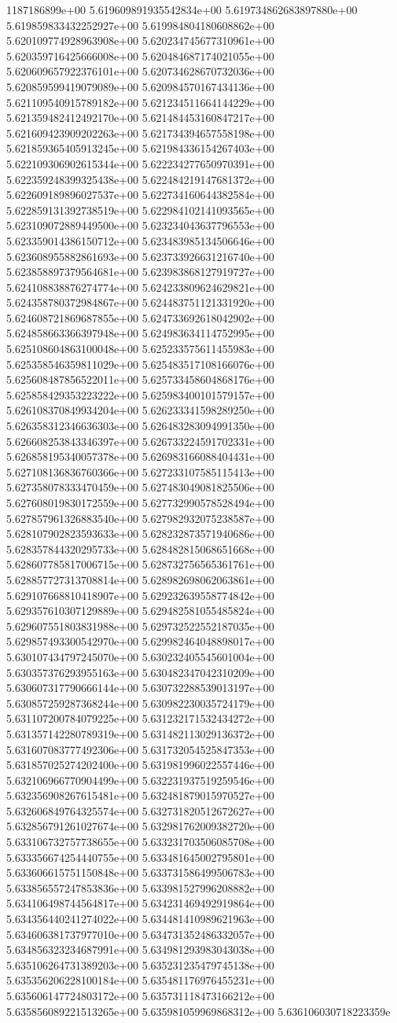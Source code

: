 1187186899e+00	5.619609891935542834e+00	5.619734862683897880e+00	5.619859833432252927e+00	5.619984804180608862e+00	5.620109774928963908e+00	5.620234745677310961e+00	5.620359716425666008e+00	5.620484687174021055e+00	5.620609657922376101e+00	5.620734628670732036e+00	5.620859599419079089e+00	5.620984570167434136e+00	5.621109540915789182e+00	5.621234511664144229e+00	5.621359482412492170e+00	5.621484453160847217e+00	5.621609423909202263e+00	5.621734394657558198e+00	5.621859365405913245e+00	5.621984336154267403e+00	5.622109306902615344e+00	5.622234277650970391e+00	5.622359248399325438e+00	5.622484219147681372e+00	5.622609189896027537e+00	5.622734160644382584e+00	5.622859131392738519e+00	5.622984102141093565e+00	5.623109072889449500e+00	5.623234043637796553e+00	5.623359014386150712e+00	5.623483985134506646e+00	5.623608955882861693e+00	5.623733926631216740e+00	5.623858897379564681e+00	5.623983868127919727e+00	5.624108838876274774e+00	5.624233809624629821e+00	5.624358780372984867e+00	5.624483751121331920e+00	5.624608721869687855e+00	5.624733692618042902e+00	5.624858663366397948e+00	5.624983634114752995e+00	5.625108604863100048e+00	5.625233575611455983e+00	5.625358546359811029e+00	5.625483517108166076e+00	5.625608487856522011e+00	5.625733458604868176e+00	5.625858429353223222e+00	5.625983400101579157e+00	5.626108370849934204e+00	5.626233341598289250e+00	5.626358312346636303e+00	5.626483283094991350e+00	5.626608253843346397e+00	5.626733224591702331e+00	5.626858195340057378e+00	5.626983166088404431e+00	5.627108136836760366e+00	5.627233107585115413e+00	5.627358078333470459e+00	5.627483049081825506e+00	5.627608019830172559e+00	5.627732990578528494e+00	5.627857961326883540e+00	5.627982932075238587e+00	5.628107902823593633e+00	5.628232873571940686e+00	5.628357844320295733e+00	5.628482815068651668e+00	5.628607785817006715e+00	5.628732756565361761e+00	5.628857727313708814e+00	5.628982698062063861e+00	5.629107668810418907e+00	5.629232639558774842e+00	5.629357610307129889e+00	5.629482581055485824e+00	5.629607551803831988e+00	5.629732522552187035e+00	5.629857493300542970e+00	5.629982464048898017e+00	5.630107434797245070e+00	5.630232405545601004e+00	5.630357376293955163e+00	5.630482347042310209e+00	5.630607317790666144e+00	5.630732288539013197e+00	5.630857259287368244e+00	5.630982230035724179e+00	5.631107200784079225e+00	5.631232171532434272e+00	5.631357142280789319e+00	5.631482113029136372e+00	5.631607083777492306e+00	5.631732054525847353e+00	5.631857025274202400e+00	5.631981996022557446e+00	5.632106966770904499e+00	5.632231937519259546e+00	5.632356908267615481e+00	5.632481879015970527e+00	5.632606849764325574e+00	5.632731820512672627e+00	5.632856791261027674e+00	5.632981762009382720e+00	5.633106732757738655e+00	5.633231703506085708e+00	5.633356674254440755e+00	5.633481645002795801e+00	5.633606615751150848e+00	5.633731586499506783e+00	5.633856557247853836e+00	5.633981527996208882e+00	5.634106498744564817e+00	5.634231469492919864e+00	5.634356440241274022e+00	5.634481410989621963e+00	5.634606381737977010e+00	5.634731352486332057e+00	5.634856323234687991e+00	5.634981293983043038e+00	5.635106264731389203e+00	5.635231235479745138e+00	5.635356206228100184e+00	5.635481176976455231e+00	5.635606147724803172e+00	5.635731118473166212e+00	5.635856089221513265e+00	5.635981059969868312e+00	5.636106030718223359e